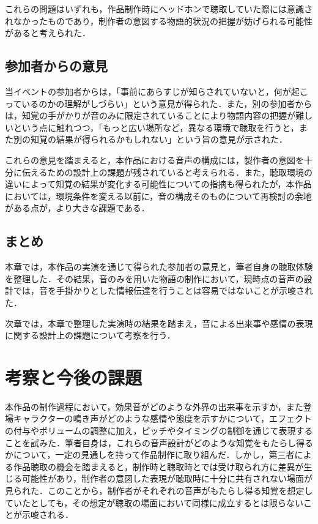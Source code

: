 これらの問題はいずれも，作品制作時にヘッドホンで聴取していた際には意識されなかったものであり，制作者の意図する物語的状況の把握が妨げられる可能性があると考えられた．

\subsection{参加者からの意見}
当イベントの参加者からは，「事前にあらすじが知らされていないと，何が起こっているのかの理解がしづらい」という意見が得られた．また，別の参加者からは，知覚の手がかりが音のみに限定されていることにより物語内容の把握が難しいという点に触れつつ，「もっと広い場所など，異なる環境で聴取を行うと，また別の知覚の結果が得られるかもしれない」という旨の意見が示された．

これらの意見を踏まえると，本作品における音声の構成には，製作者の意図を十分に伝えるための設計上の課題が残されていると考えられる．また，聴取環境の違いによって知覚の結果が変化する可能性についての指摘も得られたが，本作品においては，環境条件を変える以前に，音の構成そのものについて再検討の余地がある点が，より大きな課題である．

\subsection{まとめ}
本章では，本作品の実演を通じて得られた参加者の意見と，筆者自身の聴取体験を整理した．その結果，音のみを用いた物語の制作において，現時点の音声の設計では，音を手掛かりとした情報伝達を行うことは容易ではないことが示唆された．

次章では，本章で整理した実演時の結果を踏まえ，音による出来事や感情の表現に関する設計上の課題について考察を行う．

\section{考察と今後の課題}
本作品の制作過程において，効果音がどのような外界の出来事を示すか，また登場キャラクターの鳴き声がどのような感情や態度を示すかについて，エフェクトの付与やボリュームの調整に加え，ピッチやタイミングの制御を通じて表現することを試みた．筆者自身は，これらの音声設計がどのような知覚をもたらし得るかについて，一定の見通しを持って作品制作に取り組んだ．しかし，第三者による作品聴取の機会を踏まえると，制作時と聴取時とでは受け取られ方に差異が生じる可能性があり，制作者の意図した表現が聴取時に十分に共有されない場面が見られた．このことから，制作者がそれぞれの音声がもたらし得る知覚を想定していたとしても，その想定が聴取の場面において同様に成立するとは限らないことが示唆される．

